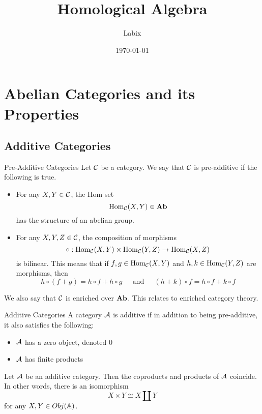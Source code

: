 \documentclass[a4paper]{article}
\title{Homological Algebra}
\author{Labix}
\date{\today}
\begin{document}
\maketitle
\begin{abstract}
\end{abstract}
\pagebreak
\tableofcontents

\pagebreak
\section{Abelian Categories and its Properties}
\subsection{Additive Categories}
\begin{defn}{Pre-Additive Categories}{} Let $\mathcal{C}$ be a category. We say that $\mathcal{C}$ is pre-additive if the following is true. 
\begin{itemize}
\item For any $X,Y\in\mathcal{C}$, the Hom set $$\operatorname{Hom}_{\mathcal{C}}(X,Y)\in\bold{Ab}$$ has the structure of an abelian group. 
\item For any $X,Y,Z\in\mathcal{C}$, the composition of morphisms $$\circ:\operatorname{Hom}_{\mathcal{C}}(X,Y)\times\operatorname{Hom}_{\mathcal{C}}(Y,Z)\to\operatorname{Hom}_{\mathcal{C}}(X,Z)$$ is bilinear. This means that if $f,g\in\operatorname{Hom}_{\mathcal{C}}(X,Y)$ and $h,k\in\operatorname{Hom}_{\mathcal{C}}(Y,Z)$ are morphisms, then $$h\circ(f+g)=h\circ f+h\circ g\;\;\;\;\text{ and }\;\;\;\;(h+k)\circ f=h\circ f+k\circ f$$
\end{itemize}
\end{defn}

We also say that $\mathcal{C}$ is enriched over $\bold{Ab}$. This relates to enriched category theory. 

\begin{defn}{Additive Categories}{} A category $\mathcal{A}$ is additive if in addition to being pre-additive, it also satisfies the following: 
\begin{itemize}
\item $\mathcal{A}$ has a zero object, denoted $0$
\item $\mathcal{A}$ has finite products
\end{itemize}
\end{defn}

\begin{lmm}{}{} Let $\mathcal{A}$ be an additive category. Then the coproducts and products of $\mathcal{A}$ coincide. In other words, there is an isomorphism $$X\times Y\cong X\amalg Y$$ for any $X,Y\in Obj(\mathbb{A})$. 
\end{lmm}
\end{document}

